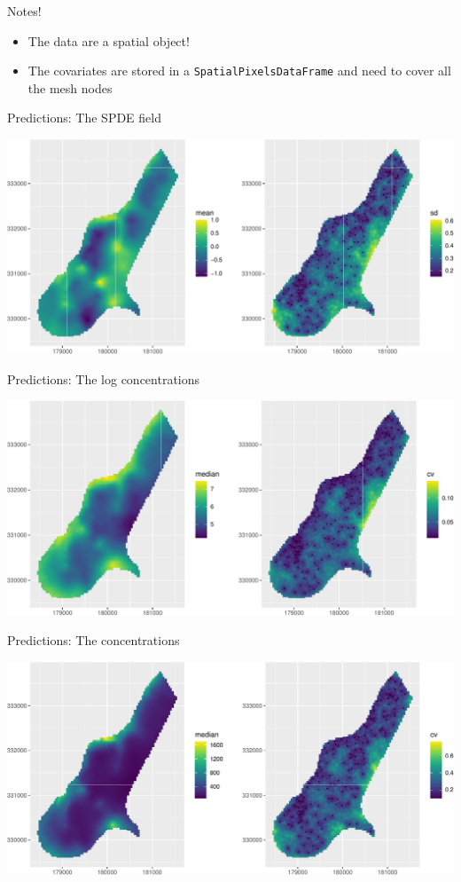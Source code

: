 \documentclass[
  ignorenonframetext,
]{beamer}
\begin{document}
\begin{frame}[fragile]{Notes!}
\protect\hypertarget{notes}{}
\begin{itemize}
\item
  The data are a spatial object!
\item
  The covariates are stored in a \texttt{SpatialPixelsDataFrame} and
  need to cover all the mesh nodes
\end{itemize}
\end{frame}

\begin{frame}{Predictions: The SPDE field}
\protect\hypertarget{predictions-the-spde-field}{}
\begin{center}\includegraphics[width=0.8\linewidth]{Part3_advanced_files/figure-beamer/unnamed-chunk-19-1} \end{center}
\end{frame}

\begin{frame}{Predictions: The log concentrations}
\protect\hypertarget{predictions-the-log-concentrations}{}
\begin{center}\includegraphics[width=0.8\linewidth]{Part3_advanced_files/figure-beamer/unnamed-chunk-20-1} \end{center}
\end{frame}

\begin{frame}{Predictions: The concentrations}
\protect\hypertarget{predictions-the-concentrations}{}
\begin{center}\includegraphics[width=0.8\linewidth]{Part3_advanced_files/figure-beamer/unnamed-chunk-21-1} \end{center}
\end{frame}
\end{document}
